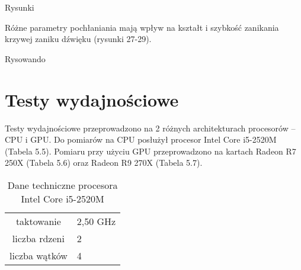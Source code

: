 Rysunki

Różne parametry pochłaniania mają wpływ na kształt i szybkość zanikania krzywej zaniku dźwięku (rysunki 27-29).

Rysowando







\section{Testy wydajnościowe}\label{sec:asdas2d}

Testy wydajnościowe przeprowadzono na 2 różnych architekturach procesorów – CPU i GPU. Do pomiarów na CPU posłużył procesor Intel Core i5-2520M (Tabela 5.5). Pomiaru przy użyciu GPU przeprowadzono na kartach Radeon R7 250X (Tabela 5.6) oraz Radeon R9 270X (Tabela 5.7).
 
\begin{table}[h]
        \centering
        \begin{threeparttable}
                \caption{Dane techniczne procesora Intel Core i5-2520M}\label{tab:table_example}
                \begin{tabularx}{0.6\textwidth}{| c | X |}
                       \midrule
		taktowanie & 2,50 GHz \\
                     liczba rdzeni & 2 \\
                    liczba wątków & 4 \\
                        \bottomrule
                \end{tabularx}
        \end{threeparttable}
\end{table}

